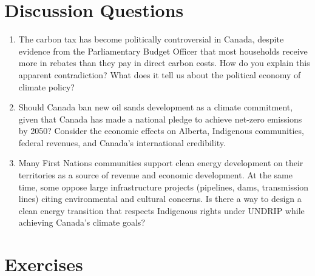 \section*{Discussion Questions}

\begin{enumerate}

\item The carbon tax has become politically controversial in Canada, despite evidence from the Parliamentary Budget Officer that most households receive more in rebates than they pay in direct carbon costs. How do you explain this apparent contradiction? What does it tell us about the political economy of climate policy?

\item Should Canada ban new oil sands development as a climate commitment, given that Canada has made a national pledge to achieve net-zero emissions by 2050? Consider the economic effects on Alberta, Indigenous communities, federal revenues, and Canada's international credibility.

\item Many First Nations communities support clean energy development on their territories as a source of revenue and economic development. At the same time, some oppose large infrastructure projects (pipelines, dams, transmission lines) citing environmental and cultural concerns. Is there a way to design a clean energy transition that respects Indigenous rights under UNDRIP while achieving Canada's climate goals?

\end{enumerate}

\section*{Exercises}

